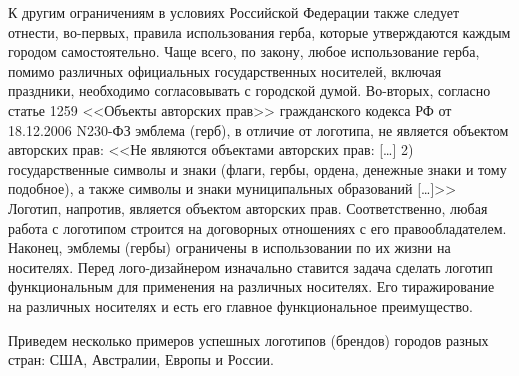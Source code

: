 К другим ограничениям в условиях Российской Федерации также следует отнести, во-первых, правила
использования герба, которые утверждаются каждым городом самостоятельно. Чаще всего, по закону,
любое использование герба, помимо различных официальных государственных носителей, включая
праздники, необходимо согласовывать с городской думой.  Во-вторых, согласно статье 1259 <<Объекты
авторских прав>> гражданского кодекса РФ от 18.12.2006 N230-ФЗ  эмблема (герб), в отличие от
логотипа, не является объектом авторских прав: <<Не являются объектами авторских прав: [\ldots] 2)
государственные символы и знаки (флаги, гербы, ордена, денежные знаки и тому подобное), а также
символы и знаки муниципальных образований [\ldots]>> Логотип,
напротив, является объектом авторских прав. Соответственно, любая работа с логотипом строится на
договорных отношениях с его правообладателем. Наконец, эмблемы (гербы) ограничены в использовании по
их жизни на носителях. Перед лого-дизайнером изначально ставится задача сделать логотип
функциональным для применения на различных носителях. Его тиражирование на различных носителях и
есть его главное функциональное преимущество.

Приведем несколько примеров успешных логотипов (брендов) городов разных стран: США, Австралии,
Европы и России.

